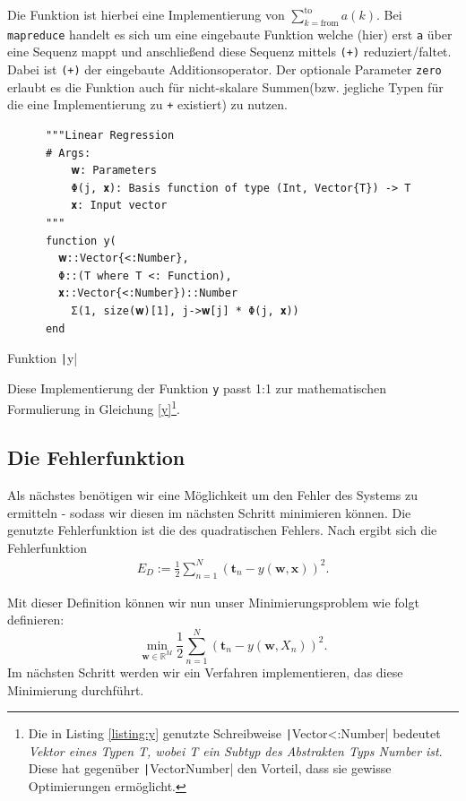 \documentclass{article}
\theoremstyle{plain} %
\theoremstyle{definition} %
\begin{document}
Die Funktion ist hierbei eine Implementierung von $\sum_{k=\text{from}}^\text{to}a(k)$. Bei \texttt{mapreduce} handelt es sich um eine eingebaute Funktion welche (hier) erst \texttt{a} über eine Sequenz mappt und anschließend diese Sequenz mittels \texttt{(+)} reduziert/faltet. Dabei ist \texttt{(+)} der eingebaute Additionsoperator. Der optionale Parameter \texttt{zero} erlaubt es die Funktion auch für nicht-skalare Summen(bzw. jegliche Typen für die eine Implementierung zu \texttt{+} existiert) zu nutzen.

\begin{listing}[H]
    \begin{verbatim}
      """Linear Regression
      # Args:
          𝐰: Parameters
          Φ(j, 𝐱): Basis function of type (Int, Vector{T}) -> T
          𝐱: Input vector
      """
      function y(
        𝐰::Vector{<:Number},
        Φ::(T where T <: Function),
        𝐱::Vector{<:Number})::Number
          Σ(1, size(𝐰)[1], j->𝐰[j] * Φ(j, 𝐱))
      end
    \end{verbatim}
    \caption{Funktion \texttt|y|}
    \label{listing:y}
\end{listing}

Diese Implementierung der Funktion \texttt{y} passt 1:1 zur mathematischen Formulierung in Gleichung \ref{y}\footnote{Die in Listing \ref{listing:y} genutzte Schreibweise \texttt|Vector{<:Number}| bedeutet \emph{Vektor eines Typen T, wobei T ein Subtyp des Abstrakten Typs Number ist}. Diese hat gegenüber \texttt|Vector{Number}| den Vorteil, dass sie gewisse Optimierungen ermöglicht.}.

\subsection{Die Fehlerfunktion}

Als nächstes benötigen wir eine Möglichkeit um den Fehler des Systems zu ermitteln - sodass wir diesen im nächsten Schritt minimieren können. Die genutzte Fehlerfunktion ist die des quadratischen Fehlers. Nach \cite[S. 140f]{Bishop} ergibt sich die Fehlerfunktion
\begin{align}
    E_D := \frac{1}{2}\sum_{n=1}^{N}(\mathbf{t}_n - y(\mathbf{w}, \mathbf{x}))^2.
\end{align}

Mit dieser Definition können wir nun unser Minimierungsproblem wie folgt definieren:
$$
  \min_{\mathbf{w} \in \mathbb{R}^M} \frac{1}{2}\sum_{n=1}^{N}(\mathbf{t}_n - y(\mathbf{w}, X_n))^2.
$$
Im nächsten Schritt werden wir ein Verfahren implementieren, das diese Minimierung durchführt.
\end{document}
